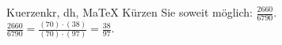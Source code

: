 \begin{MAufgabe}{Kuerzen}{kr, dh, MaTeX}
K\"urzen Sie soweit m\"oglich: $\frac{2660}{6790}$.\\ 
\ifLsg\MLoesung
\quad $\frac{2660}{6790}=\frac{(70)\cdot(38)}{(70)\cdot(97)}=\frac{38}{97}$.\else\relax\fi
 \end{MAufgabe}